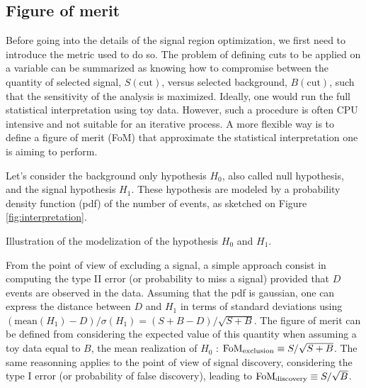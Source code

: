 


            \subsection{Figure of merit}

            Before going into the details of the signal region optimization, we first need to introduce the
            metric used to do so. The problem of defining cuts to be applied on a variable can be summarized 
            as knowing how to compromise between the quantity of selected signal, $S(\text{cut})$, versus selected
            background, $B(\text{cut})$, such that the sensitivity of the analysis is maximized. Ideally,
            one would run the full statistical interpretation using toy data. However, such a procedure 
            is often CPU intensive and not suitable for an iterative process. A more flexible way is
            to define a figure of merit (FoM) that approximate the statistical interpretation one is aiming
            to perform.

            Let's consider the background only hypothesis $H_0$, also called null hypothesis, and the 
            signal hypothesis $H_1$. These hypothesis are modeled by a probability density function (pdf) of 
            the number of events, as sketched on Figure \ref{fig:interpretation}.
           
                         {Illustration of the modelization of the hypothesis $H_0$ and $H_1$.}

            From the point of view of excluding a signal, a simple approach consist in computing the type 
            II error (or probability to miss a signal) provided that $D$ events are observed in the
            data. Assuming that the pdf is gaussian, one can express the distance between $D$ and $H_1$ in terms 
            of standard deviations using $(\text{mean}(H_1) - D) / \sigma(H_1) = (S + B - D) / \sqrt{S+B}$.
            The figure of merit can be defined from considering the expected value of this quantity when assuming 
            a toy data equal to $B$, the mean realization of $H_0$ : $\text{FoM}_\text{exclusion} \equiv S 
            / \sqrt{S+B}$. The same reasonning applies to the point of view of signal discovery, considering 
            the type I error (or probability of false discovery), leading to $\text{FoM}_\text{discovery}
            \equiv S/\sqrt{B}$.

